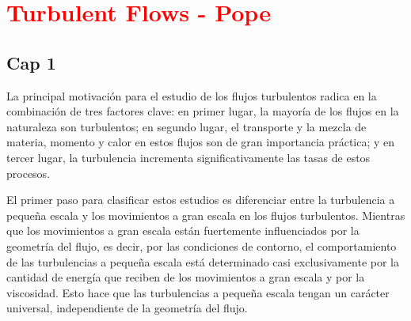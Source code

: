 


\section{\textcolor{red}{Turbulent Flows - Pope}}

\subsection{Cap 1}

La principal motivación para el estudio de los flujos turbulentos radica en la combinación de tres factores clave: en primer lugar, la mayoría de los flujos en la naturaleza son turbulentos; en segundo lugar, el transporte y la mezcla de materia, momento y calor en estos flujos son de gran importancia práctica; y en tercer lugar, la turbulencia incrementa significativamente las tasas de estos procesos. 

El primer paso para clasificar estos estudios es diferenciar entre la turbulencia a pequeña escala y los movimientos a gran escala en los flujos turbulentos. Mientras que los movimientos a gran escala están fuertemente influenciados por la geometría del flujo, es decir, por las condiciones de contorno, el comportamiento de las turbulencias a pequeña escala está determinado casi exclusivamente por la cantidad de energía que reciben de los movimientos a gran escala y por la viscosidad. Esto hace que las turbulencias a pequeña escala tengan un carácter universal, independiente de la geometría del flujo.


